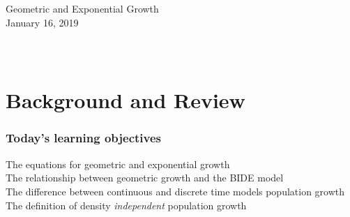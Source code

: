\documentclass[color=usenames,dvipsnames]{beamer}\usepackage[]{graphicx}\usepackage[]{color}
\newcommand{\wide}{\column{\dimexpr\paperwidth}} %
\begin{document}


{
\begin{frame}[plain]
  \vspace{-4.2cm}
  \begin{center}
    {\huge Geometric and Exponential Growth } \\
    {\large January 16, 2019 \\}
  \end{center}
  \begin{columns}
    \wide
    \rule[11pt]{\paperwidth}{0.1pt}
  \end{columns}
\end{frame}
}





\section{Background and Review}



\begin{frame}[plain]
  \frametitle{Today's learning objectives}
  \Large
  The equations for geometric and exponential growth \\
  \pause
  \vfill
  The relationship between geometric growth and the BIDE model \\
  \pause
  \vfill
  The difference between continuous and discrete time models
  population growth \\
  \pause
  \vfill
  The definition of density \textit{independent} population growth \\
\end{frame}
\end{document}
